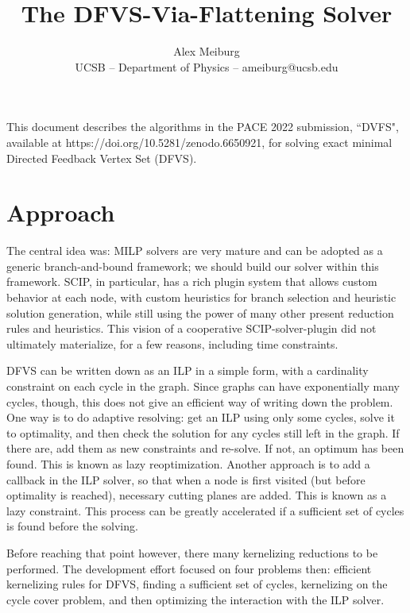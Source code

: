 \documentclass[a4paper,11pt]{article}
\title{The DFVS-Via-Flattening Solver}
\author{Alex Meiburg \\\small UCSB -- Department of Physics -- ameiburg@ucsb.edu}
\newcommand{\9}{\,\,\,\,\,\,\,\,\,}
\begin{document}
\maketitle

This document describes the algorithms in the PACE 2022 submission, ``DVFS", available at https://doi.org/10.5281/zenodo.6650921, for solving exact minimal Directed Feedback Vertex Set (DFVS).

\section{Approach}
The central idea was: MILP solvers are very mature and can be adopted as a generic branch-and-bound framework; we should build our solver within this framework. SCIP, in particular, has a rich plugin system that allows custom behavior at each node, with custom heuristics for branch selection and heuristic solution generation, while still using the power of many other present reduction rules and heuristics. This vision of a cooperative SCIP-solver-plugin did not ultimately materialize, for a few reasons, including time constraints.

\par DFVS can be written down as an ILP in a simple form, with a cardinality constraint on each cycle in the graph. Since graphs can have exponentially many cycles, though, this does not give an efficient way of writing down the problem. One way is to do adaptive resolving: get an ILP using only some cycles, solve it to optimality, and then check the solution for any cycles still left in the graph. If there are, add them as new constraints and re-solve. If not, an optimum has been found. This is known as lazy reoptimization. Another approach is to add a callback in the ILP solver, so that when a node is first visited (but before optimality is reached), necessary cutting planes are added. This is known as a lazy constraint. This process can be greatly accelerated if a sufficient set of cycles is found before the solving.

\par Before reaching that point however, there many kernelizing reductions to be performed. The development effort focused on four problems then: efficient kernelizing rules for DFVS, finding a sufficient set of cycles, kernelizing on the cycle cover problem, and then optimizing the interaction with the ILP solver.
\end{document}

